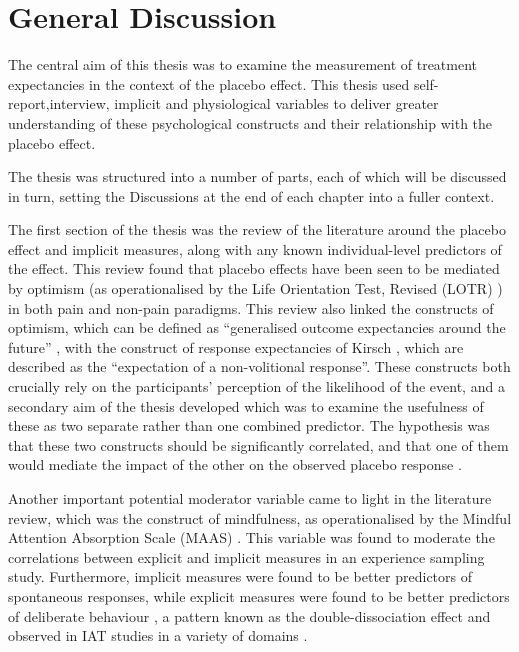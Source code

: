 

\section{General Discussion}

The central aim of this thesis was to examine the measurement of treatment
expectancies in the context of the placebo effect. This thesis used self-report,interview, implicit and physiological variables to deliver greater understanding of these psychological constructs and their relationship with the placebo effect.


The thesis was structured into a number of parts, each of which will be discussed in turn, setting the Discussions at the end of each chapter into a fuller context. 

The first section of the thesis was the review of the literature around the placebo effect and implicit measures, along with any known individual-level predictors of the effect. This review found that placebo effects have been seen to be mediated by optimism (as operationalised by the Life Orientation Test, Revised (LOTR) \cite{Scheier1994}) \cite{Geers2005,morton2009reproducibility} in both pain and non-pain paradigms. This review also linked the constructs of optimism, which can be defined as ``generalised outcome expectancies around the future'' \cite{Carver2010}, with the construct of response expectancies of Kirsch \cite{Kirsch1985,Kirsch1997}, which are described as the ``expectation of a non-volitional response''. These constructs both crucially rely on the participants' perception of the likelihood of the event, and a secondary aim of the thesis developed which was to examine the usefulness of these as two separate rather than one combined predictor. The hypothesis was that these two constructs should be significantly correlated, and that one of them would mediate the impact of the other on the observed placebo response \cite{Geers2005}. 

Another important potential moderator variable came to light in the literature review, which was the construct of mindfulness, as operationalised by the Mindful Attention Absorption Scale (MAAS) \cite{brown2003benefits}. This variable was found to moderate the correlations between explicit and implicit measures in an experience sampling study. Furthermore, implicit measures were found to be better predictors of spontaneous responses, while explicit measures were found to be better predictors of deliberate behaviour \cite{Levesque2007}, a pattern known as the double-dissociation effect and observed in IAT studies in a variety of domains \cite{Asendorpf2002,Perugini2005,Grumm2007,Steffens2006}. 


